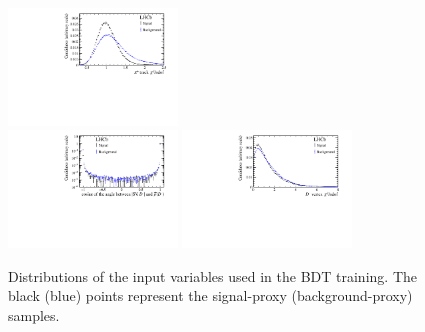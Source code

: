 \begin{figure}[tbp]
\begin{center}
		\includegraphics[width=0.40\textwidth]{07selection/figs/BDTInputs/ab1_TRACK_CHI2NDOF.pdf}\\
		\includegraphics[width=0.40\textwidth]{07selection/figs/BDTInputs/ab2_DIRA_ORIVX.pdf}
		\includegraphics[width=0.40\textwidth]{07selection/figs/BDTInputs/ab2_ENDVERTEX_CHI2NDOF.pdf}
	\end{center}
	\caption{Distributions of the input variables used in the BDT training.
	The black (blue) points represent the signal-proxy (background-proxy) samples.}
	\label{fig:BDTInput1}
\end{figure}
